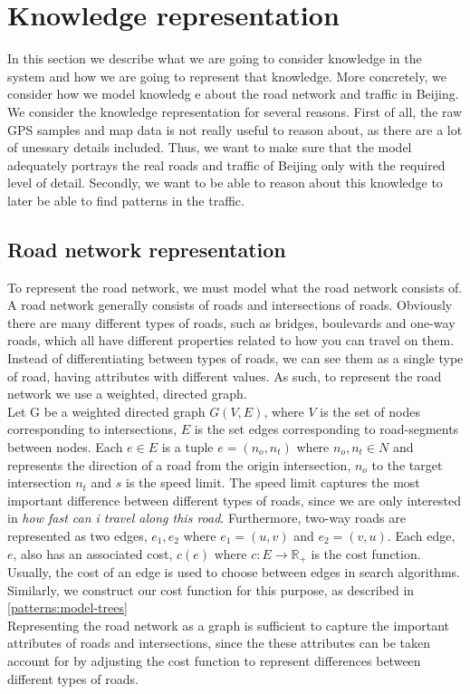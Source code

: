 \section{Knowledge representation}
In this section we describe what we are going to consider knowledge in the system and how we are going to represent that knowledge. More concretely, we consider how we model knowledg
e about the road network and traffic in Beijing. We consider the knowledge representation for several reasons. First of all, the raw GPS samples and map data is not really useful to reason about, as there are a lot of unessary details included. Thus, we want to make sure that the model adequately portrays the real roads and traffic of Beijing only with the required level of detail. Secondly, we want to be able to reason about this knowledge to later be able to find patterns in the traffic.

\subsection{Road network representation}
To represent the road network, we must model what the road network consists of. A road network generally consists of roads and intersections of roads. Obviously there are many different types of roads, such as bridges, boulevards and one-way roads, which all have different properties related to how you can travel on them. Instead of differentiating between types of roads, we can see them as a single type of road, having attributes with different values. As such, to represent the road network we use a weighted, directed graph.\\
Let G be a weighted directed graph $G(V,E)$, where $V$ is the set of nodes corresponding to intersections, $E$ is the set edges corresponding to road-segments between nodes. Each $e \in E$ is a tuple $e=(n_o, n_t)$ where $n_o, n_t \in N$ and represents the direction of a road from the origin intersection, $n_o$ to the target intersection $n_t$ and $s$ is the speed limit. The speed limit captures the most important difference between different types of roads, since we are only interested in \emph{how fast can i travel along this road}. Furthermore, two-way roads are represented as two edges, $e_1, e_2$ where $e_1 = (u, v)$ and $e_2=(v, u)$. Each edge, $e$, also has an associated cost, $c(e)$ where  $c: E \rightarrow \mathbb R_+$ is the cost function. Usually, the cost of an edge is used to choose between edges in search algorithms. Similarly, we construct our cost function for this purpose, as described in \ref{patterns:model-trees}
\\
Representing the road network as a graph is sufficient to capture the important attributes of roads and intersections, since the these attributes can be taken account for by adjusting the cost function to represent differences between different types of roads. 

